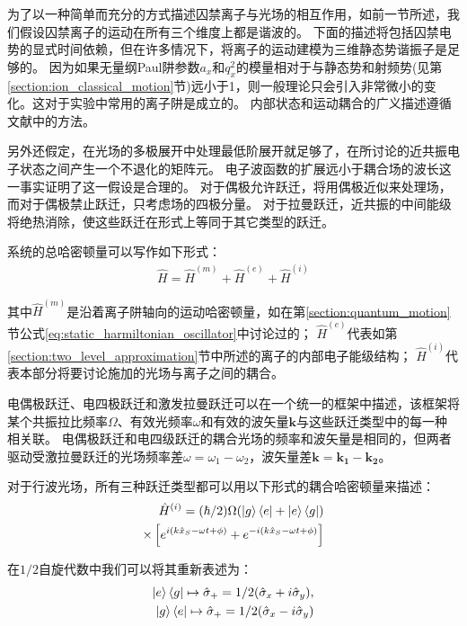 为了以一种简单而充分的方式描述囚禁离子与光场的相互作用，如前一节所述，我们假设囚禁离子的运动在所有三个维度上都是谐波的。
下面的描述将包括囚禁电势的显式时间依赖，但在许多情况下，将离子的运动建模为三维静态势谐振子是足够的。
因为如果无量纲Paul阱参数$a_x$和$q_x^2$的模量相对于与静态势和射频势(见第\ref{section:ion_classical_motion}节)远小于1，则一般理论只会引入非常微小的变化。这对于实验中常用的离子阱是成立的。
内部状态和运动耦合的广义描述遵循文献\cite[]{Cirac_Garay_Blatt_Parkins_Zoller_2002,1996Paul}中的方法。

另外还假定，在光场的多极展开中处理最低阶展开就足够了，在所讨论的近共振电子状态之间产生一个不退化的矩阵元。
电子波函数的扩展远小于耦合场的波长这一事实证明了这一假设是合理的。
对于偶极允许跃迁，将用偶极近似来处理场，而对于偶极禁止跃迁，只考虑场的四极分量。
对于拉曼跃迁，近共振的中间能级将绝热消除，使这些跃迁在形式上等同于其它类型的跃迁。

系统的总哈密顿量可以写作如下形式：
\begin{align}
    \hat{H}=\hat{H}^{(m)}+\hat{H}^{(e)}+\hat{H}^{(i)}
\end{align}

其中$\hat{H}^{(m)}$是沿着离子阱轴向的运动哈密顿量，如在第\ref{section:quantum_motion}节公式\eqref{eq:static_harmiltonian_oscillator}中讨论过的；
$\hat{H}^{(e)}$代表如第\ref{section:two_level_approximation}节中所述的离子的内部电子能级结构；
$\hat{H}^{(i)}$代表本部分将要讨论施加的光场与离子之间的耦合。

电偶极跃迁、电四极跃迁和激发拉曼跃迁可以在一个统一的框架中描述，该框架将某个共振拉比频率$\Omega$、有效光频率$\omega$和有效的波矢量$\mathbf{k}$与这些跃迁类型中的每一种相关联。
电偶极跃迁和电四级跃迁的耦合光场的频率和波矢量是相同的，但两者驱动受激拉曼跃迁的光场频率差$\omega=\omega_1-\omega_2$，波矢量差$\mathbf{k}=\mathbf{k_1}-\mathbf{k_2}$。

对于行波光场，所有三种跃迁类型都可以用以下形式的耦合哈密顿量来描述：
\begin{align}
    \hat{H}^{(i)}=(\hbar/2)\Omega(\ket{g}\bra{e}+\ket{e}\bra{g})\\
    \times\left[e^{i(k\hat{x}_S-\omega t + \phi)}+e^{-i(k\hat{x}_S-\omega t + \phi)}\right]
\end{align}

在$1/2$自旋代数中我们可以将其重新表述为：
\begin{align}
    \ket{e}\bra{g}\mapsto\hat{\sigma}_+=1/2(\hat{\sigma}_x+i\hat{\sigma}_y),\\
    \ket{g}\bra{e}\mapsto\hat{\sigma}_+=1/2(\hat{\sigma}_x-i\hat{\sigma}_y)
\end{align}

